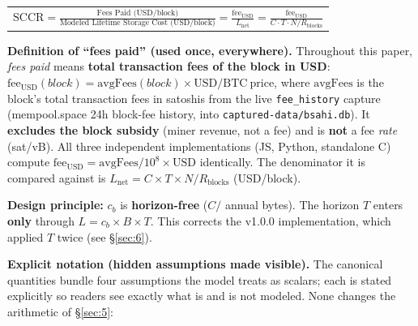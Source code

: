 \documentclass[11pt]{article}
\begin{document}
\begin{center}
\renewcommand{\arraystretch}{1.5}
\begin{tabular}{c}
\rule{0pt}{14pt}$\displaystyle \mathrm{SCCR} = \frac{\text{Fees Paid (USD/block)}}{\text{Modeled Lifetime Storage Cost (USD/block)}} = \frac{\mathrm{fee}_{\mathrm{USD}}}{L_{\mathrm{net}}} = \frac{\mathrm{fee}_{\mathrm{USD}}}{C \cdot T \cdot N / R_{\mathrm{blocks}}}$\rule{0pt}{14pt}
\end{tabular}
\end{center}

\textbf{Definition of ``fees paid'' (used once, everywhere).} Throughout this paper, \emph{fees paid} means \textbf{total transaction fees of the block in USD}: $\mathrm{fee_{USD}}(block) = \mathrm{avgFees}(block) \times \mathrm{USD/BTC\ price}$, where $\mathrm{avgFees}$ is the block's total transaction fees in satoshis from the live \texttt{fee\_history} capture (mempool.space 24h block-fee history, into \texttt{captured-data/bsahi.db}). It \textbf{excludes the block subsidy} (miner revenue, not a fee) and is \textbf{not} a fee \emph{rate} (sat/vB). All three independent implementations (JS, Python, standalone C) compute $\mathrm{fee_{USD}} = \mathrm{avgFees}/10^8 \times \mathrm{USD}$ identically. The denominator it is compared against is $L_{\mathrm{net}} = C \times T \times N / R_{\mathrm{blocks}}$ (USD/block).

\textbf{Design principle:} $c_b$ is \textbf{horizon-free} ($C /$ annual bytes). The horizon $T$ enters \textbf{only} through $L = c_b \times B \times T$. This corrects the v1.0.0 implementation, which applied $T$ twice (see \S\ref{sec:6}).

\textbf{Explicit notation (hidden assumptions made visible).} The canonical quantities bundle four assumptions the model treats as scalars; each is stated explicitly so readers see exactly what is and is not modeled. None changes the arithmetic of \S\ref{sec:5}:
\end{document}
